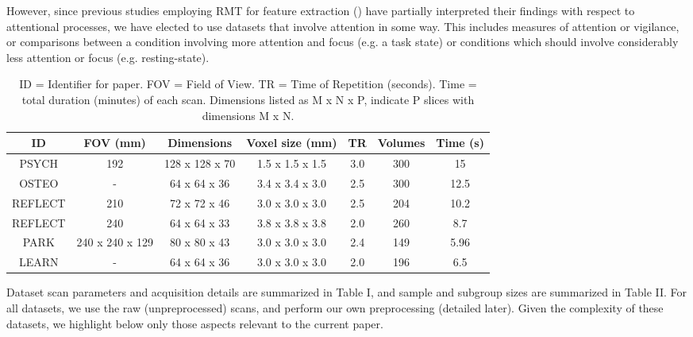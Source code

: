 However, since previous studies employing RMT for feature extraction
(\cite{wangRandomMatrixTheory2016,matharooSpontaneousBackpainAlters2020}) have partially interpreted
their findings with respect to attentional processes, we have elected to use datasets that involve
attention in some way. This includes measures of attention or vigilance, or comparisons between a
condition involving more attention and focus (e.g. a task state) or conditions which should involve
considerably less attention or focus (e.g. resting-state).

\begin{table}[h!]
\small
\centering
\begin{tabular}{ c c c c c c c }
\hline
\textbf{ID}  & \textbf{FOV (mm)}  & \textbf{Dimensions}  & \textbf{Voxel size (mm)} & \textbf{TR} & \textbf{Volumes} & \textbf{Time (s)} \\
\hline
PSYCH   &  192              & 128 x 128 x 70 & 1.5 x 1.5 x 1.5 & 3.0 & 300 & 15 \\
OSTEO   &  -                & 64 x 64 x 36   & 3.4 x 3.4 x 3.0 & 2.5 & 300 & 12.5 \\
REFLECT &  210              & 72 x 72 x 46   & 3.0 x 3.0 x 3.0 & 2.5 & 204 & 10.2 \\
REFLECT &  240              & 64 x 64 x 33   & 3.8 x 3.8 x 3.8 & 2.0 & 260 & 8.7 \\
PARK    &  240 x 240 x 129  & 80 x 80 x 43   & 3.0 x 3.0 x 3.0 & 2.4 & 149 & 5.96 \\
LEARN   &  -                & 64 x 64 x 36   & 3.0 x 3.0 x 3.0 & 2.0 & 196 & 6.5 \\
\hline
\end{tabular}
\caption{
    ID = Identifier for paper. FOV = Field of View. TR = Time of Repetition (seconds).
    Time = total duration (minutes) of each scan. Dimensions listed as M x N x P,
    indicate P slices with dimensions M x N.
}
\label{table:1}
\end{table}


Dataset scan parameters and acquisition details are summarized in Table I, and sample and subgroup
sizes are summarized in Table II. For all datasets, we use the raw (unpreprocessed) scans, and
perform our own preprocessing (detailed later). Given the complexity of these datasets, we highlight
below only those aspects relevant to the current paper.

